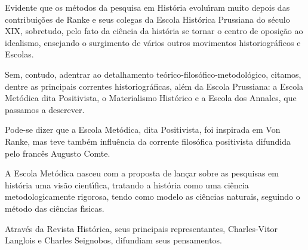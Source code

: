 \documentclass[
12pt,		%
openright,	%
twoside,  %
a4paper,			%
chapter=TITLE,		%
english,			%
french,				%
spanish,			%
brazil				%
]{USPSC-classe/USPSC}
\begin{document}
Evidente que os m\'etodos da pesquisa em Hist\'oria evolu\'{\i}ram muito depois das contribui\c{c}\~oes de Ranke e seus colegas da Escola Hist\'orica Prussiana do s\'eculo XIX, sobretudo, pelo fato da ci\^encia  da hist\'oria se tornar o centro de oposi\c{c}\~ao ao idealismo, ensejando o surgimento de v\'arios outros movimentos historiogr\'aficos e Escolas.










Sem, contudo, adentrar ao detalhamento te\'orico-filos\'ofico-metodol\'ogico, citamos, dentre as principais correntes historiogr\'aficas, al\'em da Escola Prussiana: a Escola Met\'odica dita Positivista, o Materialismo Hist\'orico e a Escola dos Annales, que passamos a descrever.










Pode-se dizer que a Escola Met\'odica, dita Positivista, foi inspirada em Von Ranke, mas teve tamb\'em influ\^encia da corrente filos\'ofica positivista difundida pelo franc\^es Augusto Comte.










A Escola Met\'odica nasceu com a proposta de  lan\c{c}ar sobre as pesquisas em hist\'oria uma vis\~ao cient\'{\i}fica, tratando a hist\'oria como uma ci\^encia metodologicamente rigorosa, tendo como modelo as ci\^encias naturais, seguindo o m\'etodo das ci\^encias f\'{\i}sicas.










Atrav\'es da Revista Hist\'orica, seus principais representantes, Charles-Vitor Langlois e Charles Seignobos, difundiam seus pensamentos.











\noindent\begin{center}\mbox{\centering{}}\end{center}
\end{document}
